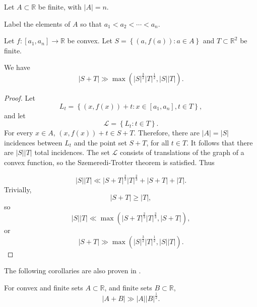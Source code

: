 \documentclass[12pt,reqno]{amsart}
\begin{document}
\begin{theorem} \label{thm:translations-of-convex-szt}
Let \(A \subset \mathbb{R} \) be finite, with \(\left\lvert A \right\rvert = n\). 

Label the
elements of \(A\) so that \(a_1 < a_2 < \cdots < a_{n} \). 

Let \(f : [a_1,a_{n} ] \to \mathbb{R} \) be convex. Let \(S = \left\{ (a,f(a)) : a \in A \right\} \) and \(T \subset \mathbb{R} ^{2}\) be finite. 

We have
\[
    \left\lvert S + T \right\rvert \gg \max \left( \left\lvert S \right\rvert ^{\frac{3}{2} } \left\lvert T \right\rvert ^{\frac{1}{2} } , \left\lvert S \right\rvert \left\lvert T \right\rvert  \right)
.\]
\end{theorem}

\begin{proof}
    Let
    \[
        L_{t} = \left\{ (x,f(x)) + t : x \in [a_1,a_{n} ], t \in T \right\} 
    ,\]
    and let
    \[
        \mathcal{L} = \left\{ L_{t} : t \in T \right\} 
    .\]
    For every \(x \in A\), \((x,f(x)) + t \in S + T\). Therefore, there are \(\left\lvert A \right\rvert = \left\lvert S \right\rvert \) incidences
    between \(L_{t} \) and the point set \(S + T\), for all \(t \in T\). It follows that there are \(\left\lvert S \right\rvert \left\lvert T \right\rvert \)
    total incidences. The set \(\mathcal{L} \) consists of
    translations of the graph of a convex function, so the Szemeredi-Trotter theorem is satisfied. Thus
    
    \[
        \left\lvert S \right\rvert \left\lvert T \right\rvert \ll \left\lvert S + T \right\rvert ^{\frac{2}{3} } \left\lvert T \right\rvert ^{\frac{2}{3} } + \left\lvert S + T \right\rvert + \left\lvert T \right\rvert 
    .\]
    Trivially,
    \[
        \left\lvert S + T \right\rvert \geq \left\lvert T \right\rvert 
    ,\]
    so
    \[
        \left\lvert S \right\rvert \left\lvert T \right\rvert  \ll\max \left( \left\lvert S + T \right\rvert ^{\frac{2}{3} }\left\lvert T \right\rvert ^{\frac{2}{3} }, \left\lvert S+T \right\rvert  \right) 
    ,\]
    or
    \[
        \left\lvert S + T \right\rvert \gg \max \left( \left\lvert S \right\rvert ^{\frac{3}{2} } \left\lvert T \right\rvert ^{\frac{1}{2} }, \left\lvert S \right\rvert \left\lvert T \right\rvert  \right) 
    .\]
\end{proof}

The following corollaries are also proven in \cite{elekes}.

\begin{corollary}
    For convex and finite sets \(A \subset \mathbb{R} \), and finite sets \(B \subset \mathbb{R} \),
    \[
        \left\lvert A + B \right\rvert \gg \left\lvert A \right\rvert \left\lvert B \right\rvert ^{\frac{1}{2} }
    .\]
\end{corollary}
    
\end{document}
